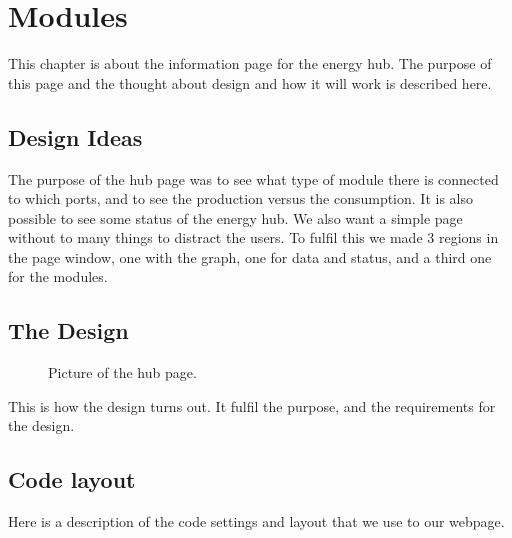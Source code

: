 \newpage
\chapter{Modules}
This chapter is about the information page for the energy hub. The purpose of this page and the thought about design and how it will work is described here.
\section{Design Ideas}
The purpose of the hub page was to see what type of module there is connected to which ports, and to see the production versus the consumption. It is also possible to see some status of the energy hub. We also want a simple page without to many things to distract the users. To fulfil this we made 3 regions in the page window, one with the graph, one for data and status, and a third one for the modules.
\section{The Design}

\begin{figure}[h!]
	\center
		\setlength\fboxsep{0pt}
		\setlength\fboxrule{1pt}
   	\caption{Picture of the hub page.}
   	\label{fig:hub_page_design}
\end{figure}
This is how the design turns out. It fulfil the purpose, and the requirements for the design.
\section{Code layout}
Here is a description of the code settings and layout that we use to our webpage.
